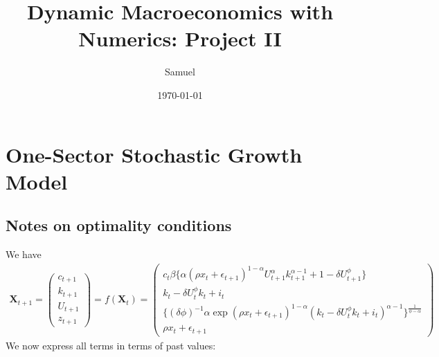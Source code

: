 \documentclass[a4paper]{article}
\title{Dynamic Macroeconomics with Numerics: Project II}
\author{Samuel}
\date{\today}
\theoremstyle{definition}
\begin{document}
\maketitle
\newpage
\section{One-Sector Stochastic Growth Model}
\subsection*{Notes on optimality conditions}
We have
	\begin{align*}
	\mathbf X_{t+1} = 
		\begin{pmatrix}
		c_{t+1} \\ k_{t+1} \\ U_{t+1} \\ z_{t+1} 
		\end{pmatrix}
	= f(\mathbf X_t) = 
		\begin{pmatrix}
		c_t \beta \Big\{ \alpha (\rho x_t + \epsilon_{t+1})^{1-\alpha}U_{t+1}^\alpha k_{t+1}^{\alpha-1} + 1 - \delta U_{t+1}^\phi \Big\} \\
		k_t - \delta U_t^\phi k_t + i_t \\
		\Big\{ (\delta\phi)^{-1}\alpha \exp(\rho x_t + \epsilon_{t+1})^{1-\alpha}(k_t - \delta U_t^\phi k_t + i_t)^{\alpha-1} \Big\}^{\frac{1}{\phi-\alpha}} \\
		\rho x_t + \epsilon_{t+1}
		\end{pmatrix}	
	\end{align*}
We now express all terms in terms of past values:
\end{document}
